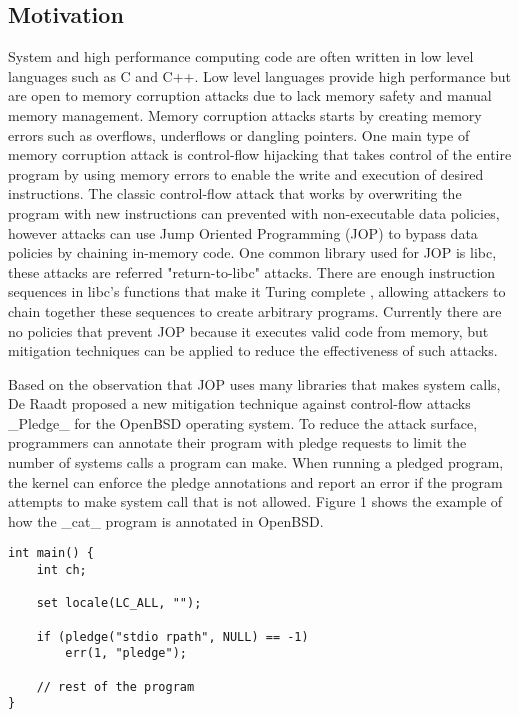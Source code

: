 \subsection{Motivation}

System and high performance computing code are often written in low level languages such as C and C++. Low level languages provide high performance but are open to memory corruption attacks due to lack memory safety and manual memory management. Memory corruption attacks \cite{Szekeres_2013} starts by creating memory errors such as overflows, underflows or dangling pointers. One main type of memory corruption attack is control-flow hijacking that takes control of the entire program by using memory errors to enable the write and execution of desired instructions. The classic control-flow attack that works by overwriting the program with new instructions can prevented with non-executable data policies, however attacks can use Jump Oriented Programming (JOP) to bypass data policies by chaining in-memory code. One common library used for JOP is libc, these attacks are referred "return-to-libc" attacks. There are enough instruction sequences in libc's functions that make it Turing complete \cite{Tran_2011}, allowing attackers to chain together these sequences to create arbitrary programs. Currently there are no policies that prevent JOP because it executes valid code from memory, but mitigation techniques \cite{Li_2010}\cite{Pappas_2012}\cite{pledge} can be applied to reduce the effectiveness of such attacks.

Based on the observation that JOP uses many libraries that makes system calls, De Raadt proposed a new mitigation technique against control-flow attacks _Pledge_\cite{pledge} for the OpenBSD operating system. To reduce the attack surface, programmers can annotate their program with pledge\cite{pledge(2)} requests to limit the number of systems calls a program can make. When running a pledged program, the kernel can enforce the pledge annotations and report an error if the program attempts to make system call that is not allowed. Figure 1 shows the example of how the _cat_ program is annotated in OpenBSD.

\begin{lstlisting}[caption=cat.c]
int main() {
    int ch;
    
    set locale(LC_ALL, "");
    
    if (pledge("stdio rpath", NULL) == -1)
        err(1, "pledge");
        
    // rest of the program
}
\end{lstlisting}